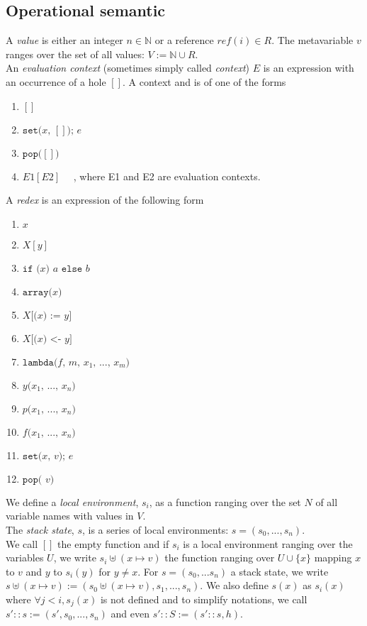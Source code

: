 \documentclass[12pt,a4paper]{article}
\newcommand{\cl}[1]{\texttt{#1}}
\newcommand{\N}{\mathbb{N}}
\newcommand{\econt}[1]{[#1]}
\begin{document}
\subsection{Operational semantic}

A \emph{value} is either an integer $n \in \N$ or a reference $ref(i) \in R$. The metavariable $v$ ranges over the set of all values: $V := \N \cup R$.\\

An \emph{evaluation context} (sometimes simply called \emph{context}) $E$ is an expression with an occurrence of a hole $\econt{}$. A context  and is of one of the forms
\begin{enumerate}
\itemsep-0.2em
\item $\econt{}$
\item $\cl{set(} x \cl{, } \econt{} \cl{); } e $
\item $\cl{pop(} \econt{} \cl{)}$
\item $E1\econt{E2}$ \ \ , where E1 and E2 are evaluation contexts.
\end{enumerate}

A \emph{redex} is an expression of the following form
\begin{enumerate}
\itemsep-0.2em
\item $x$
\item $X[y]$
\item $\cl{if (} x \cl{) } a \cl{ else } b $
\item $\cl{array(} x \cl{)}$
\item $X\cl{[(} x \cl{) := } y \cl{]}$
\item $X\cl{[(} x \cl{) <- } y \cl{]}$
\item $\cl{lambda(}  f \cl{, } m \cl{, } x_1 \cl{, } ... \cl{, } x_m \cl{)}$
\item $y\cl{(} x_1 \cl{, } ... \cl{, } x_n \cl{)}$
\item $p\cl{(} x_1 \cl{, } ... \cl{, } x_n \cl{)}$
\item $f\cl{(} x_1 \cl{, } ... \cl{, } x_n \cl{)}$
\item $\cl{set(} x \cl{, } v \cl{); } e$
\item $\cl{pop( } v \cl{)}$
\end{enumerate}

We define a \emph{local environment}, $s_i$, as a function ranging over the set $N$ of all variable names with values in $V$.\\
The \emph{stack state}, $s$, is a series of local environments: $s = (s_0, ... , s_n)$.\\
We call $[]$ the empty function and if $s_i$ is a local environment ranging over the variables $U$, we write $s_i \uplus (x \mapsto v)$ the function ranging over $U \cup \{x\}$ mapping $x$ to $v$ and $y$ to $s_i(y)$ for $y \neq x$. For $s = (s_0, ... s_n)$ a stack state, we write $s \uplus (x \mapsto v) := \left( s_0 \uplus (x \mapsto v), s_1, ... , s_n \right)$. We also define $s(x)$ as $s_i(x)$ where $\forall j < i, s_j(x)$ is not defined and to simplify notations, we call $s' :: s := (s', s_0, ... , s_n)$ and even $s' :: S  := (s' :: s, h)$.
\end{document}

